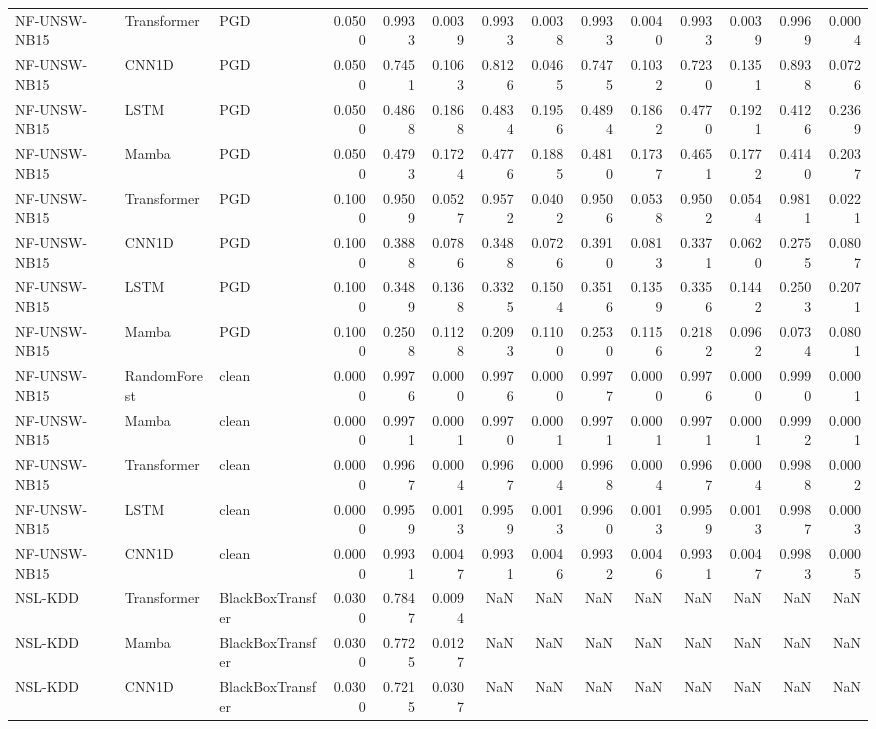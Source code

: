 \begin{table}[ht]
\begin{tabular}{lllrrrrrrrrrrr}
NF-UNSW-NB15 & Transformer & PGD & 0.0500 & 0.9933 & 0.0039 & 0.9933 & 0.0038 & 0.9933 & 0.0040 & 0.9933 & 0.0039 & 0.9969 & 0.0004 \\
NF-UNSW-NB15 & CNN1D & PGD & 0.0500 & 0.7451 & 0.1063 & 0.8126 & 0.0465 & 0.7475 & 0.1032 & 0.7230 & 0.1351 & 0.8938 & 0.0726 \\
NF-UNSW-NB15 & LSTM & PGD & 0.0500 & 0.4868 & 0.1868 & 0.4834 & 0.1956 & 0.4894 & 0.1862 & 0.4770 & 0.1921 & 0.4126 & 0.2369 \\
NF-UNSW-NB15 & Mamba & PGD & 0.0500 & 0.4793 & 0.1724 & 0.4776 & 0.1885 & 0.4810 & 0.1737 & 0.4651 & 0.1772 & 0.4140 & 0.2037 \\
NF-UNSW-NB15 & Transformer & PGD & 0.1000 & 0.9509 & 0.0527 & 0.9572 & 0.0402 & 0.9506 & 0.0538 & 0.9502 & 0.0544 & 0.9811 & 0.0221 \\
NF-UNSW-NB15 & CNN1D & PGD & 0.1000 & 0.3888 & 0.0786 & 0.3488 & 0.0726 & 0.3910 & 0.0813 & 0.3371 & 0.0620 & 0.2755 & 0.0807 \\
NF-UNSW-NB15 & LSTM & PGD & 0.1000 & 0.3489 & 0.1368 & 0.3325 & 0.1504 & 0.3516 & 0.1359 & 0.3356 & 0.1442 & 0.2503 & 0.2071 \\
NF-UNSW-NB15 & Mamba & PGD & 0.1000 & 0.2508 & 0.1128 & 0.2093 & 0.1100 & 0.2530 & 0.1156 & 0.2182 & 0.0962 & 0.0734 & 0.0801 \\
NF-UNSW-NB15 & RandomForest & clean & 0.0000 & 0.9976 & 0.0000 & 0.9976 & 0.0000 & 0.9977 & 0.0000 & 0.9976 & 0.0000 & 0.9990 & 0.0001 \\
NF-UNSW-NB15 & Mamba & clean & 0.0000 & 0.9971 & 0.0001 & 0.9970 & 0.0001 & 0.9971 & 0.0001 & 0.9971 & 0.0001 & 0.9992 & 0.0001 \\
NF-UNSW-NB15 & Transformer & clean & 0.0000 & 0.9967 & 0.0004 & 0.9967 & 0.0004 & 0.9968 & 0.0004 & 0.9967 & 0.0004 & 0.9988 & 0.0002 \\
NF-UNSW-NB15 & LSTM & clean & 0.0000 & 0.9959 & 0.0013 & 0.9959 & 0.0013 & 0.9960 & 0.0013 & 0.9959 & 0.0013 & 0.9987 & 0.0003 \\
NF-UNSW-NB15 & CNN1D & clean & 0.0000 & 0.9931 & 0.0047 & 0.9931 & 0.0046 & 0.9932 & 0.0046 & 0.9931 & 0.0047 & 0.9983 & 0.0005 \\
NSL-KDD & Transformer & BlackBoxTransfer & 0.0300 & 0.7847 & 0.0094 & NaN & NaN & NaN & NaN & NaN & NaN & NaN & NaN \\
NSL-KDD & Mamba & BlackBoxTransfer & 0.0300 & 0.7725 & 0.0127 & NaN & NaN & NaN & NaN & NaN & NaN & NaN & NaN \\
NSL-KDD & CNN1D & BlackBoxTransfer & 0.0300 & 0.7215 & 0.0307 & NaN & NaN & NaN & NaN & NaN & NaN & NaN & NaN \\

\end{tabular}
\end{table}

